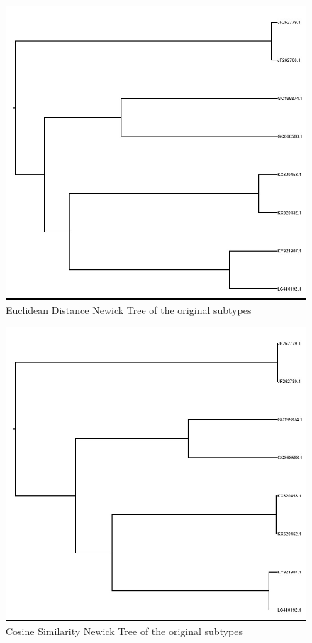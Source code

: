 \documentclass[10pt]{article}
\begin{document}
\begin{figure}[htbp]
  \centering
    \includegraphics[width=\textwidth]{figures/euclidean_original.jpeg}
    \caption{Euclidean Distance Newick Tree of the original subtypes}
\end{figure}

\begin{figure}[htbp]
    \centering
    \includegraphics[width=\textwidth]{figures/cosine_original.jpeg}
    \caption{Cosine Similarity Newick Tree of the original subtypes}
\end{figure}
\end{document}
